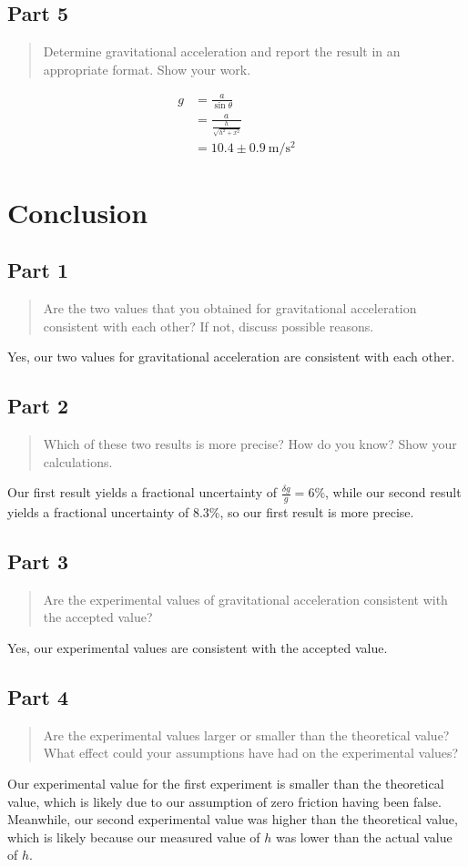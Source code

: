 \documentclass[10pt]{extarticle}
\newcommand{\plain}[1]{\textrm{#1}}
\begin{document}
{\subsection*{Part 5}
\begin{quote}
	Determine gravitational acceleration and report the result in an appropriate format. Show your work.
\end{quote}
\begin{align*}
	g &= \frac{a}{\sin \theta} \\
	&= \frac{a}{\frac{h}{\sqrt{h^2 + x^2}}} \\
	&= 10.4 \pm 0.9 ~\plain{m/s$^{2}$}
\end{align*}
\pagebreak
\section*{Conclusion}
\subsection*{Part 1}
\begin{quote}
	Are the two values that you obtained for gravitational acceleration consistent with each other?  If not, discuss possible reasons.
\end{quote}
Yes, our two values for gravitational acceleration are consistent with each other.
\subsection*{Part 2}
\begin{quote}
	Which of these two results is more precise?  How do you know? Show your calculations.
\end{quote}
Our first result yields a fractional uncertainty of $\frac{\delta g}{g} = 6\%$, while our second result yields a fractional uncertainty of $8.3\%$, so our first result is more precise.
\subsection*{Part 3}
\begin{quote}
	Are the experimental values of gravitational acceleration consistent with the accepted value? 
\end{quote}
Yes, our experimental values are consistent with the accepted value.
\subsection*{Part 4}
\begin{quote}
	Are the experimental values larger or smaller than the theoretical value? What effect could your assumptions have had on the experimental values?
\end{quote}
Our experimental value for the first experiment is smaller than the theoretical value, which is likely due to our assumption of zero friction having been false. Meanwhile, our second experimental value was higher than the theoretical value, which is likely because our measured value of $h$ was lower than the actual value of $h$.
}
\end{document}
